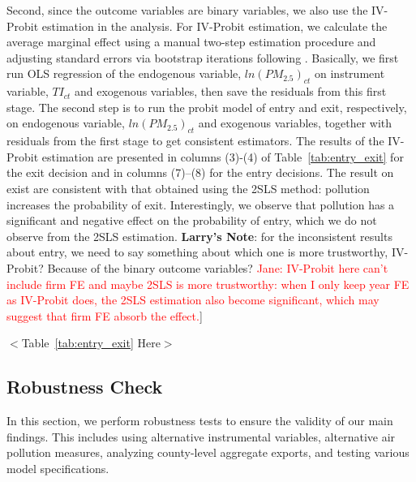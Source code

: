 \documentclass[12pt]{article}
\begin{document}
Second, since the outcome variables are binary variables, we also use the
IV-Probit estimation in the analysis. For IV-Probit estimation, we calculate the 
average marginal effect using a manual two-step estimation procedure and adjusting standard errors via bootstrap iterations 
following \citep{wooldridge2010econometric}. Basically, we
first run OLS regression of the endogenous variable, $ln(PM_{2.5})_{ct}$ on
instrument variable, $TI_{ct}$ and exogenous variables, then
save the residuals from this first stage. The second step is to run the probit
model of entry and exit, respectively, on endogenous variable, $ln(PM_{2.5})_{ct}$ and exogenous variables, together with residuals from the first stage to get consistent estimators. 
The results of the IV-Probit estimation are presented in columns (3)-(4) of Table~\ref{tab:entry_exit} for the exit decision and in 
columns (7)--(8) for the entry decisions. The result on exist are consistent with that obtained using the 2SLS method: pollution increases the probability of exit. Interestingly, we observe that pollution has a significant and negative effect on the probability of entry, which we do not observe from the 2SLS estimation. \lbrack \textbf{Larry's Note}: for the inconsistent results about entry, we
need to say something about which one is more trustworthy, IV-Probit? Because
of the binary outcome variables? \textcolor{red}{Jane: IV-Probit here can't include firm FE and maybe 2SLS is more trustworthy: when I only keep year FE as IV-Probit does, the 2SLS estimation also become significant, which may suggest that firm FE absorb the effect.}]

\begin{center}
  $<$Table~\ref{tab:entry_exit} Here$>$
\end{center}

\subsection{Robustness Check}

In this section, we perform robustness tests to ensure the validity of our main findings. This includes using alternative instrumental variables, alternative air pollution measures, analyzing county-level aggregate exports, and testing various model specifications.
\end{document}
